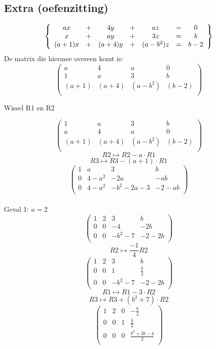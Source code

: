 \documentclass[10pt,a4paper]{article}
\begin{document}
\subsection*{Extra (oefenzitting)}
\[
\left\lbrace
\begin{array}{c c c c c c c}
ax &+& 4y &+& az &=& 0\\
x  &+& ay &+& 3z &=& b\\
(a+1)x &+& (a+4)y &+& (a-b^{2})z &=& b-2
\end{array}
\right\rbrace
\]
De matrix die hiermee overeen komt is:
\[
\begin{pmatrix}
a & 4 & a & 0\\
1 & a & 3 & b\\
(a+1) & (a+4) & (a-b^{2}) & (b-2)\\
\end{pmatrix}
\]
\begin{center}
Wissel R1 en R2
\end{center}
\[
\begin{pmatrix}
1 & a & 3 & b\\
a & 4 & a & 0\\
(a+1) & (a+4) & (a-b^{2}) & (b-2)\\
\end{pmatrix}
\]
\[ R2 \longmapsto R2 - a\cdot R1 \]
\[ R3 \longmapsto R3 - (a+1)\cdot R1 \]
\[
\begin{pmatrix}
1 & a & 3 & b\\
0 & 4-a^{2} & -2a & -ab\\
0 & 4-a^{2} & -b^{2}-2a-3 & -2-ab\\
\end{pmatrix}
\]
\\Geval 1: $a=2$
\[
\begin{pmatrix}
1 & 2 & 3 & b\\
0 & 0 & -4 & -2b\\
0 & 0 & -b^{2}-7 & -2-2b\\
\end{pmatrix}
\]
\[ R2 \longmapsto \frac{-1}{4}R2 \]
\[
\begin{pmatrix}
1 & 2 & 3 & b\\
0 & 0 & 1 & \frac{b}{2}\\
0 & 0 & -b^{2}-7 & -2-2b\\
\end{pmatrix}
\]
\[ R1 \longmapsto R1 - 3\cdot R2 \]
\[ R3 \longmapsto R3 + (b^{2}+7)\cdot R2 \]
\[
\begin{pmatrix}
1 & 2 & 0 & -\frac{b}{2}\\
0 & 0 & 1 & \frac{b}{2}\\
0 & 0 & 0 & \frac{b^{3}+3b-4}{2}\\
\end{pmatrix}
\]
\end{document}

